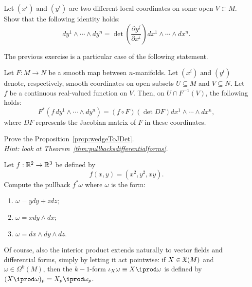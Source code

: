 \begin{exercise}
	Let $(x^i)$ and $(y^i)$ are two different local coordinates on some open $V\subset M$.
	Show that the following identity holds:
	\begin{equation}
		dy^1\wedge\cdots\wedge dy^n = \det\left(\frac{\partial y^j}{\partial x^i}\right) dx^1\wedge\cdots\wedge dx^n.
	\end{equation}
\end{exercise}

The previous exercise is a particular case of the following statement.

\begin{proposition}\label{prop:wedgeToJDet}
	Let $F:M\to N$ be a smooth map between $n$-manifolds.
	Let $(x^i)$ and $(y^i)$ denote, respectively, smooth coordinates on open subsets $U\subseteq M$ and $V\subseteq N$.
	Let $f$ be a continuous real-valued function on $V$.
	Then, on $U\cap F^{-1}(V)$, the following holds:
	\begin{equation}
		F^*(f\, dy^1\wedge\cdots\wedge dy^n)
		= (f\circ F) (\det DF) dx^1\wedge\cdots\wedge dx^n,
	\end{equation}
	where $DF$ represents the Jacobian matrix of $F$ in these coordinates.
\end{proposition}

\begin{exercise}
	Prove the Proposition~\ref{prop:wedgeToJDet}.\\
	\textit{\small Hint: look at Theorem~\ref{thm:pullbacksdifferentialforms}.}
\end{exercise}

\begin{exercise}
	Let $f: \mathbb{R}^2 \to \mathbb{R}^3$ be defined by
	\begin{equation}
		f(x, y) = (x^2, y^2, xy).
	\end{equation}
	Compute the pullback $f^*\omega$ where $\omega$ is the form:
	\begin{enumerate}
		\item $\omega = y dy + z dz$;
		\item $\omega = x dy \wedge dx$;
		\item $\omega = dx \wedge dy\wedge dz$.
	\end{enumerate}
\end{exercise}

Of course, also the interior product extends naturally to vector fields and differential forms, simply by letting it act pointwise: if $X\in\mathfrak{X}(M)$ and $\omega\in\Omega^k(M)$, then the $k-1$-form $\iota_X\omega\equiv X\iprod\omega$ is defined by $(X\iprod\omega)_p = X_p \iprod \omega_p$.

